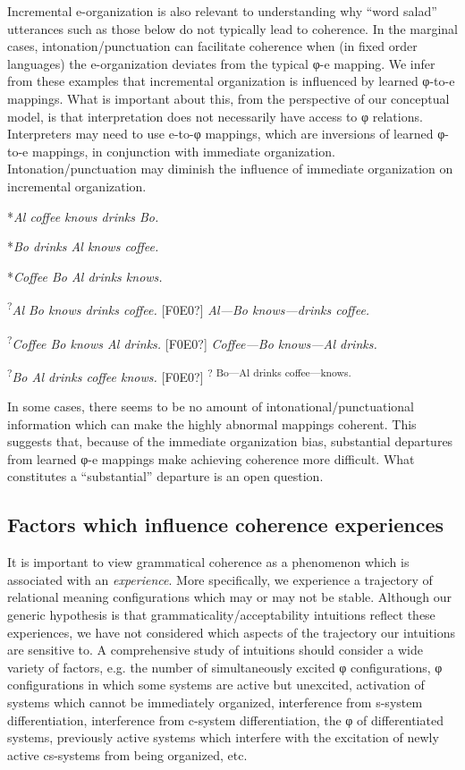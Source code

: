   Incremental e-organization is also relevant to understanding why “word salad” utterances such as those below do not typically lead to coherence. In the marginal cases, intonation/punctuation can facilitate coherence when (in fixed order languages) the e-organization deviates from the typical φ-e mapping. We infer from these examples that incremental organization is influenced by learned φ-to-e mappings. What is important about this, from the perspective of our conceptual model, is that interpretation does not necessarily have access to φ relations. Interpreters may need to use e-to-φ mappings, which are inversions of learned φ-to-e mappings, in conjunction with immediate organization. Intonation/punctuation may diminish the influence of immediate organization on incremental organization. 

    *\textit{Al coffee knows drinks Bo.}  

    *\textit{Bo drinks Al knows coffee.}

    *\textit{Coffee Bo Al drinks knows.}

    \textsuperscript{?}\textit{Al Bo knows drinks coffee.}   [F0E0?]   \textit{Al—Bo knows—drinks coffee.}

    \textsuperscript{?}\textit{Coffee Bo knows Al drinks.}   [F0E0?]  \textit{Coffee—Bo knows—Al drinks.}

    \textsuperscript{?}\textit{Bo Al drinks coffee knows.}  [F0E0?]  \textsuperscript{? Bo—Al drinks coffee—knows.}

  In some cases, there seems to be no amount of intonational/punctuational information which can make the highly abnormal mappings coherent. This suggests that, because of the immediate organization bias, substantial departures from learned φ-e mappings make achieving coherence more difficult. What constitutes a “substantial” departure is an open question.

\subsection{Factors which influence coherence experiences}

It is important to view grammatical coherence as a phenomenon which is associated with an \textit{experience}. More specifically, we experience a trajectory of relational meaning configurations which may or may not be stable. Although our generic hypothesis is that grammaticality/acceptability intuitions reflect these experiences, we have not considered which aspects of the trajectory our intuitions are sensitive to. A comprehensive study of intuitions should consider a wide variety of factors, e.g. the number of simultaneously excited φ configurations, φ configurations in which some systems are active but unexcited, activation of systems which cannot be immediately organized, interference from s-system differentiation, interference from c-system differentiation, the φ of differentiated systems, previously active systems which interfere with the excitation of newly active cs-systems from being organized, etc. 


